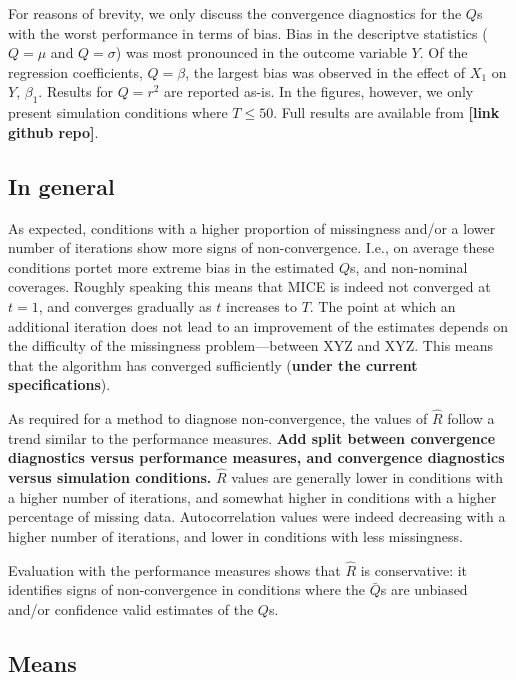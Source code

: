 \documentclass[Royal,times,sageh]{sagej}
\begin{document}
For reasons of brevity, we only discuss the convergence diagnostics for
the \(Q\)s with the worst performance in terms of bias. Bias in the
descriptve statistics (\(Q=\mu\) and \(Q=\sigma\)) was most pronounced
in the outcome variable \(Y\). Of the regression coefficients,
\(Q=\beta\), the largest bias was observed in the effect of \(X_1\) on
\(Y\), \(\beta_1\). Results for \(Q=r^2\) are reported as-is. In the
figures, however, we only present simulation conditions where
\(T\leq50\). Full results are available from \textbf{{[}link github
repo{]}}.

\hypertarget{in-general}{%
\subsection{In general}\label{in-general}}

As expected, conditions with a higher proportion of missingness and/or a
lower number of iterations show more signs of non-convergence. I.e., on
average these conditions portet more extreme bias in the estimated
\(Q\)s, and non-nominal coverages. Roughly speaking this means that MICE
is indeed not converged at \(t=1\), and converges gradually as \(t\)
increases to \(T\). The point at which an additional iteration does not
lead to an improvement of the estimates depends on the difficulty of the
missingness problem---between XYZ and XYZ. This means that the algorithm
has converged sufficiently (\textbf{under the current specifications}).

As required for a method to diagnose non-convergence, the values of
\(\widehat{R}\) follow a trend similar to the performance measures.
\textbf{Add split between convergence diagnostics versus performance
measures, and convergence diagnostics versus simulation conditions.}
\(\widehat{R}\) values are generally lower in conditions with a higher
number of iterations, and somewhat higher in conditions with a higher
percentage of missing data. Autocorrelation values were indeed
decreasing with a higher number of iterations, and lower in conditions
with less missingness.

Evaluation with the performance measures shows that \(\widehat{R}\) is
conservative: it identifies signs of non-convergence in conditions where
the \(\bar{Q}\)s are unbiased and/or confidence valid estimates of the
\(Q\)s.

\hypertarget{means}{%
\subsection{Means}\label{means}}
\end{document}
